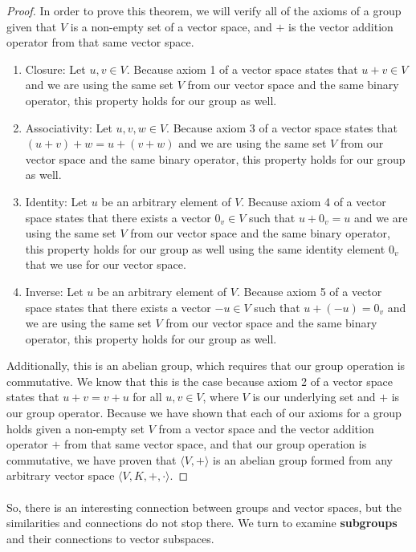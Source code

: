 \documentclass[twoside]{article}
\newcommand{\done}{\renewcommand\qedsymbol{$\blacksquare$}}
\begin{document}
\begin{spacing}{1.25}
\begin{proof}
    In order to prove this theorem, we will verify all of the axioms of a group
    given that $V$ is a non-empty set of a vector space, and $+$ is the vector 
    addition operator from that same vector space. 
    \begin{enumerate}
      \item Closure: Let $u,v \in V$. Because axiom 1 of a vector space states that
      $u+v \in V$ and we are using the same set $V$ from our vector space and the 
      same binary operator, this property holds for our group as well.
      \item Associativity: Let $u,v,w \in V$. Because axiom 3 of a vector space states that
      $(u+v)+w = u+(v+w)$ and we are using the same set $V$ from our vector space and the
      same binary operator, this property holds for our group as well.
      \item Identity: Let $u$ be an arbitrary element of $V$. Because axiom 4 of a vector space states that
      there exists a vector $0_v \in V$ such that $u+0_v = u$ and we are using the same set $V$ from our vector space and the
      same binary operator, this property holds for our group as well using the 
      same identity element $0_v$ that we use for our vector space.
      \item Inverse: Let $u$ be an arbitrary element of $V$. Because axiom 5 of a vector space states that
      there exists a vector $-u \in V$ such that $u+(-u) = 0_v$ and we are using the same set $V$ from our vector space and the
      same binary operator, this property holds for our group as well.
    \end{enumerate}

Additionally, this is an abelian group, which requires that our group operation 
is commutative. We know that this is the case because axiom 2 of a vector space states that
$u+v = v+u$ for all $u,v \in V$, where $V$ is our underlying set and $+$ is our group operator.
Because we have shown that each of our axioms for a group holds given a non-empty 
set $V$ from a vector space and the vector addition operator $+$ from that same
vector space, and that our group operation is commutative, we have proven that
$\langle V, + \rangle$ is an abelian group formed from any arbitrary vector space 
$\langle V, K, +, \cdot \rangle$.
\done  
\end{proof}

\paragraph*{} So, there is an interesting connection between groups and vector spaces,
but the similarities and connections do not stop there. We turn to examine 
\textbf{subgroups} and their connections to vector subspaces.


\end{spacing}
\end{document}
